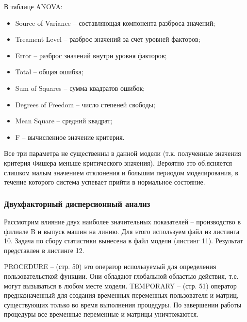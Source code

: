 \documentclass[a4paper, 12pt]{article}        %
\begin{document}






В таблице ANOVA:
\begin{itemize}
\item Source of Variance -- составляющая компонента разброса значений;
\item Treament Level -- разброс значений за счет уровней факторов;
\item Error -- разброс значений внутри уровня факторов;
\item Total -- общая ошибка;
\item Sum of Squares -- сумма квадратов ошибок;
\item Degrees of Freedom -- число степеней свободы;
\item Mean Square -- средний квадрат;
\item F -- вычисленное значение критерия.
\end{itemize}

Все три параметра не существенны в данной модели (т.к. полученные значения критерия Фишера меньше критического значения). Вероятно это об.ясняется слишком малым значением отклонения и большим периодом моделирования, в течение которого система успевает прийти в нормальное состояние.

\newpage
\subsubsection{Двухфакторный дисперсионный анализ}

Рассмотрим влияние двух наиболее значительных показателей -- производство в филиале B и выпуск машин на линию. Для этого используем файл из листинга 10. Задача по сбору статистики вынесена в файл модели (листинг 11). Результат представлен в листинге 12.





PROCEDURE -- (стр. 50) это оператор используемый для определения пользовательсткой функции. Они обладают глобальной областью действия, т.е. могут вызываться в любом месте модели.
TEMPORARY -- (стр. 51) оператор предназначенный для создания временных переменных пользователя и матриц, существующих только во время выполнения процедуры. По завершении работы процедуры все временные переменные и матрицы уничтожаются.
\end{document}
